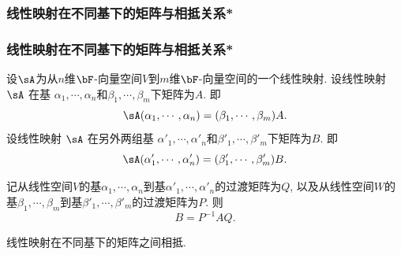 \subsubsection{线性映射在不同基下的矩阵与相抵关系*}
\begin{frame}\frametitle{线性映射在不同基下的矩阵与相抵关系*}
设$\sA$为从$n$维$\bF$-向量空间$V$到$m$维$\bF$-向量空间的一个线性映射.
\pp
设线性映射 $\sA$ 在基 $\alpha_1,\cdots,\alpha_n$和$\beta_1,\cdots,\beta_m$下矩阵为$A$. 即
\[\sA(\alpha_1,\cdots,\alpha_n) = (\beta_1,\cdots,\beta_m)A.\]
\pp
设线性映射 $\sA$ 在另外两组基 $\alpha'_1,\cdots,\alpha'_n$和$\beta'_1,\cdots,\beta'_m$下矩阵为$B$. 即
\[\sA(\alpha'_1,\cdots,\alpha'_n) = (\beta'_1,\cdots,\beta'_m)B. \pp\]
\vspace{-4mm}
\begin{theorem}
记从线性空间$V$的基$\alpha_1,\cdots,\alpha_n$到基$\alpha'_1,\cdots,\alpha'_n$的过渡矩阵为$Q$,
\pp
以及从线性空间$W$的基$\beta_1,\cdots,\beta_m$到基$\beta'_1,\cdots,\beta'_m$的过渡矩阵为$P$.
\pp
则
\[B = P^{-1}AQ.\]
\end{theorem}
\pp
{}
\pp
\begin{corollary}
线性映射在不同基下的矩阵之间相抵.
\end{corollary}
\pp
{}
\pp

\end{frame}




